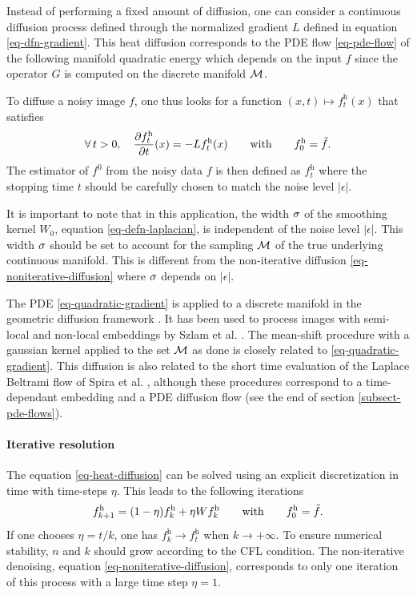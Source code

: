 \documentclass[final]{siamltex}
\newcommand{\heat}{\text{h}}
\newcommand{\quadra}{\text{q}}
\newcommand{\F}{f}
\newcommand{\tF}{\tilde \F}
\newcommand{\fz}{f^0}
\begin{document}
Instead of performing a fixed amount of diffusion, one can consider a continuous diffusion process defined through the normalized gradient $L$ defined in equation \eqref{eq-dfn-gradient}. This heat diffusion corresponds to the PDE flow \eqref{eq-pde-flow} of the following manifold quadratic energy
\eql{\label{eq-quadratic-gradient}
	\foralls g \in \ldeux(\Mm), \quad
	\energy_{\F}^{\quadra}(g) = \frac{1}{2}\norm{G g}^2,
}
which depends on the input $\F$ since the operator $G$ is computed on the discrete manifold $\mathcal{M}$.

To diffuse a noisy image $\F$, one thus looks for a function $(x,t) \mapsto \F_t^{\heat}(x)$ that satisfies
\begin{equation}\label{eq-heat-diffusion}
	\foralls t>0, \quad \pd{\F_t^{\heat}}{t}(x) = -L \F_t^{\heat}(x)
	\qqwithqq \F_0^{\heat} = \tF.
\end{equation}
The estimator of $\fz$ from the noisy data $\F$ is then defined as $\F_{t}^{\heat}$ where the stopping time $t$ should be carefully chosen to match the noise level $|\epsilon|$.

It is important to note that in this application, the width $\sigma$ of the smoothing kernel $W_0$, equation  \eqref{eq-defn-laplacian}, is independent of the noise level $|\epsilon|$. This width $\sigma$ should be set to account for the sampling $\mathcal{M}$ of the true underlying continuous manifold. This is different from the non-iterative diffusion \eqref{eq-noniterative-diffusion} where $\sigma$ depends on $|\epsilon|$.

The PDE \eqref{eq-quadratic-gradient} is applied to a discrete manifold in the geometric diffusion framework \cite{coifman-geometric-diffusion}. It has been used to process images with semi-local and non-local embeddings by Szlam et al. \cite{szlam-regularization}. The mean-shift procedure with a gaussian kernel applied to the set $\mathcal{M}$ as done \cite{comaniciu-mean-shift} is closely related to \eqref{eq-quadratic-gradient}. This diffusion is also related to the short time evaluation of the Laplace Beltrami flow of Spira et al. \cite{spira-short-time-beltrami}, although these procedures correspond to a time-dependant embedding and a PDE diffusion flow (see the end of section \ref{subsect-pde-flows}).

\paragraph{Iterative resolution}

The equation \eqref{eq-heat-diffusion} can be solved using an explicit discretization in time with time-steps $\eta$. This leads to the following iterations
\begin{equation}
	\label{eq-iterative-heat-eq}
	\F_{k+1}^{\heat} = (1-\eta)\F_k^{\heat} + \eta W \F_k^{\heat} \qqwithqq \F_0^{\heat}=\tF. 
\end{equation}
If one chooses $\eta=t/k$, one has $\F_{k}^{\heat} \rightarrow \F_t^{\heat}$ when $k \rightarrow +\infty$. To ensure numerical stability, $n$ and $k$ should grow according to the CFL condition. The non-iterative denoising, equation \eqref{eq-noniterative-diffusion}, corresponds to only one iteration of this process with a large time step $\eta=1$.
\end{document}
